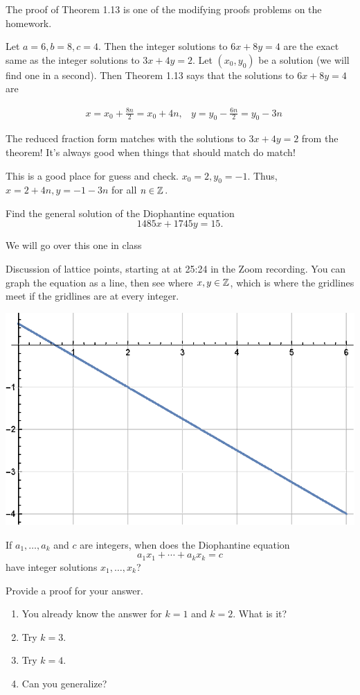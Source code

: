 \documentclass[letterpaper, 11 pt]{article}
\begin{document}
The proof of Theorem 1.13 is one of the modifying proofs problems on the homework. 

\begin{example}
 Let $a=6, b=8, c=4$. Then the integer solutions to $6x+8y=4$ are the exact same as the integer solutions to $3x+4y=2$. Let $(x_0,y_0)$ be a solution (we will find one in a second). Then Theorem 1.13 says that the solutions to $6x+8y=4$ are 
 
\begin{align*}
& x=x_0+\frac{8n}{2}=x_0+4n, &y=y_0-\frac{6n}{2}=y_0-3n
\end{align*}

The reduced fraction form matches with the solutions to $3x+4y=2$ from the theorem! It's always good when things that should match do match!

This is a good place for guess and check. $x_0=2, y_0=-1$. Thus, $x=2+4n, y=-1-3n$ for all $n\in\mathbb Z$.
\end{example}

\begin{br}
Find the general solution of the Diophantine equation \[1485x+1745y=15.\] 
\end{br}

We will go over this one in class

Discussion of lattice points, starting at at 25:24 in the Zoom recording. You can graph the equation as a line, then see where $x,y\in\mathbb Z$,  which is where the gridlines meet if the gridlines are at every integer.

\includegraphics[width=\textwidth]{diophantinelattice}

\begin{br}
 If $a_1,\dots,a_k$ and $c$ are integers, when does the Diophantine equation \[a_1x_1+\cdots+a_kx_k=c\] have integer solutions $x_1,\dots,x_k$?
 
 Provide a proof for your answer.
 
\begin{enumerate}
 \item You already know the answer for $k=1$ and $k=2$. What is it?
 \item Try $k=3$.
 \item Try $k=4$.
\item Can you generalize?
\end{enumerate}
\end{br}
\end{document}

